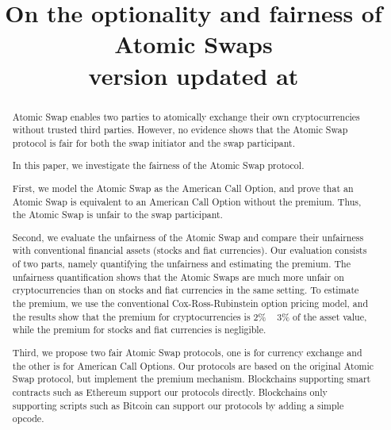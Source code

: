 \documentclass[sigconf, natbib=false]{acmart}
\renewcommand\_{\textunderscore\allowbreak}
\begin{document}
\title{
    On the optionality and fairness of Atomic Swaps \\
    {\normalsize \normalfont version updated at \DTMnow }
}

\begin{abstract}
Atomic Swap enables two parties to atomically exchange their own cryptocurrencies without trusted third parties.
However, no evidence shows that the Atomic Swap protocol is fair for both the swap initiator and the swap participant.

In this paper, we investigate the fairness of the Atomic Swap protocol.

First, we model the Atomic Swap as the American Call Option,
and prove that an Atomic Swap is equivalent to an American Call Option without the premium.
Thus, the Atomic Swap is unfair to the swap participant.

Second, we evaluate the unfairness of the Atomic Swap and compare their unfairness with conventional financial assets (stocks and fiat currencies).
Our evaluation consists of two parts, namely quantifying the unfairness and estimating the premium.
The unfairness quantification shows that the Atomic Swaps are much more unfair on cryptocurrencies than on stocks and fiat currencies in the same setting.
To estimate the premium, we use the conventional Cox-Ross-Rubinstein option pricing model, and the results show that the premium for cryptocurrencies is 2\% ~ 3\% of the asset value, while the premium for stocks and fiat currencies is negligible.

Third, we propose two fair Atomic Swap protocols,
one is for currency exchange and the other is for American Call Options.
Our protocols are based on the original Atomic Swap protocol, but implement the premium mechanism.
Blockchains supporting smart contracts such as Ethereum support our protocols directly.
Blockchains only supporting scripts such as Bitcoin can support our protocols by adding a simple opcode.
\end{abstract}
\end{document}
